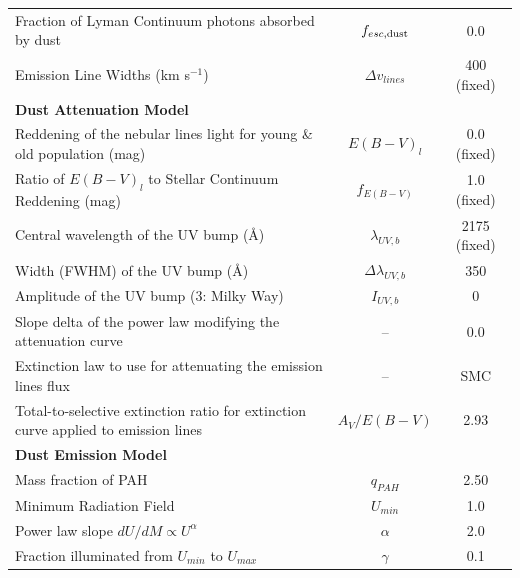 \documentclass[twocolumn,tight,times,linenumbers]{aastex631}
\begin{document}
\begin{table}
\begin{tabular*}{\textwidth}{@{\extracolsep{\fill}}lcc}
				Fraction of Lyman Continuum photons absorbed by dust          & $f_{esc,\rm{dust}}$    & 0.0 \\
				Emission Line Widths (km s$^{-1}$)											   &  $\Delta v_{lines}$       & 400 (fixed) \\
				\hline
				\textbf{Dust Attenuation Model} \citep{Calzetti2000}    &  &\\ 
				Reddening of the nebular lines light for young \& old population (mag) & $E(B-V)_l$ & 0.0 (fixed) \\
				Ratio of $E(B-V)_l$ to Stellar Continuum Reddening (mag) & $f_{E(B-V)}$ & 1.0 (fixed) \\
				Central wavelength of the UV bump (\AA)									  &     $\lambda_{UV,b}$   & 2175 (fixed) \\
				Width (FWHM) of the UV bump (\AA)											& $\Delta\lambda_{UV,b}$ & 350 \\
				Amplitude of the UV bump (3: Milky Way)									  &        $I_{UV,b}$ 				 & 0\\
				Slope delta of the power law modifying the attenuation curve &        -- 							  & 0.0 \\
				Extinction law to use for attenuating the emission lines flux    &        --                              & SMC \citep{Pei1992} \\
				Total-to-selective extinction ratio for extinction curve applied to emission lines & $A_V / E(B-V)$ & 2.93 \\
				\hline
				\textbf{Dust Emission Model} \citep{Draine2014} & & \\
				Mass fraction of PAH																	&       $q_{PAH}$			&  2.50 \\
				Minimum Radiation Field																 &       $U_{min}$            &   1.0 \\
				Power law slope $dU/dM \propto U^\alpha$								 &       $\alpha$               &    2.0 \\
				Fraction illuminated from $U_{min}$ to $U_{max}$ 				  &          $\gamma$           &    0.1 \\
				\hline
			\end{tabular*}
		\end{table}
		
\end{document}
